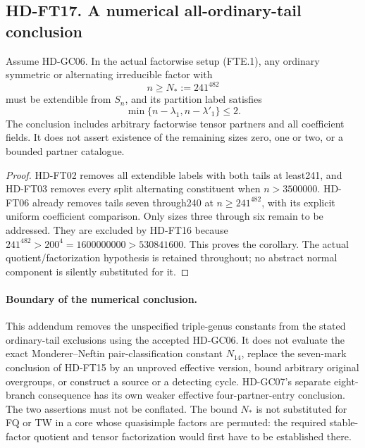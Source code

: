 \subsection*{HD-FT17. A numerical all-ordinary-tail conclusion}

\begin{corollary}[HD-FT17]
Assume HD-GC06.  In the actual factorwise setup (FTE.1), any
ordinary symmetric or alternating irreducible factor with
\[
                         n\ge N_*:=241^{482}
 \tag{FTE.10}
\]
must be extendible from \(S_n\), and its partition label satisfies
\[
                \min\{n-\lambda_1,n-\lambda'_1\}\le2.
 \tag{FTE.11}
\]
The conclusion includes arbitrary factorwise tensor partners and
all coefficient fields.  It does not assert existence of the
remaining sizes zero, one or two, or a bounded partner catalogue.
\end{corollary}

\begin{proof}
HD-FT02 removes all extendible labels with both tails at least241,
and HD-FT03 removes every split alternating constituent when
\(n>3500000\).  HD-FT06 already removes tails seven through240 at
\(n\ge241^{482}\), with its explicit uniform coefficient comparison.
Only sizes three through six remain to be addressed.  They are
excluded by HD-FT16 because
\(241^{482}>200^4=1600000000>530841600\).
This proves the corollary.  The actual quotient/factorization
hypothesis is retained throughout; no abstract normal component is
silently substituted for it.
\end{proof}

\paragraph{Boundary of the numerical conclusion.}
This addendum removes the unspecified triple-genus constants from
the stated ordinary-tail exclusions using the accepted HD-GC06.
It does not evaluate the exact Monderer--Neftin pair-classification
constant \(N_{14}\), replace the seven-mark conclusion of HD-FT15
by an unproved effective version, bound arbitrary original overgroups,
or construct a source or a detecting cycle.  HD-GC07's separate
eight-branch consequence has its own weaker effective
four-partner-entry conclusion.  The two assertions must not be conflated.
The bound \(N_*\) is not substituted for FQ or TW in a core whose
quasisimple factors are permuted: the required stable-factor quotient
and tensor factorization would first have to be established there.
